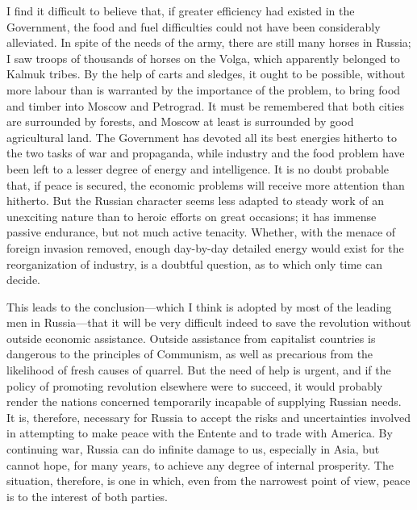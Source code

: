 I find it difficult to believe that, if greater efficiency had existed in the Government, the food and fuel difficulties could not have been considerably alleviated. In spite of the needs of the army, there are still many horses in Russia; I saw troops of thousands of horses on the Volga, which apparently belonged to Kalmuk tribes. By the help of carts and sledges, it ought to be possible, without more labour than is warranted by the importance of the problem, to bring food and timber into Moscow and Petrograd. It must be remembered that both cities are surrounded by forests, and Moscow at least is surrounded by good agricultural land. The Government has devoted all its best energies hitherto to the two tasks of war and propaganda, while industry and the food problem have been left to a lesser degree of energy and intelligence. It is no doubt probable that, if peace is secured, the economic problems will receive more attention than hitherto. But the Russian character seems less adapted to steady work of an unexciting nature than to heroic efforts on great occasions; it has immense passive endurance, but not much active tenacity. Whether, with the menace of foreign invasion removed, enough day-by-day detailed energy would exist for the reorganization of industry, is a doubtful question, as to which only time can decide.

This leads to the conclusion---which I think is adopted by most of the leading men in Russia---that it will be very difficult indeed to save the revolution without outside economic assistance. Outside assistance from capitalist countries is dangerous to the principles of Communism, as well as precarious from the likelihood of fresh causes of quarrel. But the need of help is urgent, and if the policy of promoting revolution elsewhere were to succeed, it would probably render the nations concerned temporarily incapable of supplying Russian needs. It is, therefore, necessary for Russia to accept the risks and uncertainties involved in attempting to make peace with the Entente and to trade with America. By continuing war, Russia can do infinite damage to us, especially in Asia, but cannot hope, for many years, to achieve any degree of internal prosperity. The situation, therefore, is one in which, even from the narrowest point of view, peace is to the interest of both parties.

